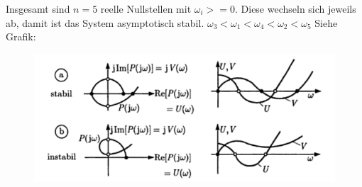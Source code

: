 \begin{tcolorbox}[colback=white!10!white,colframe=green!30!black,title=CLM Kriterium]
        Insgesamt sind $n=5$ reelle Nullstellen mit $\omega_i >= 0$. Diese wechseln sich jeweils ab, damit ist das System asymptotisch stabil. $\omega_3 < \omega_1 < \omega_4 < \omega_2 < \omega_5$ Siehe Grafik:
        \begin{figure}[H]
\centering
\includegraphics[width=0.7\linewidth]{images/clm}
\label{fig:clm}
\end{figure}

        
\end{tcolorbox}
